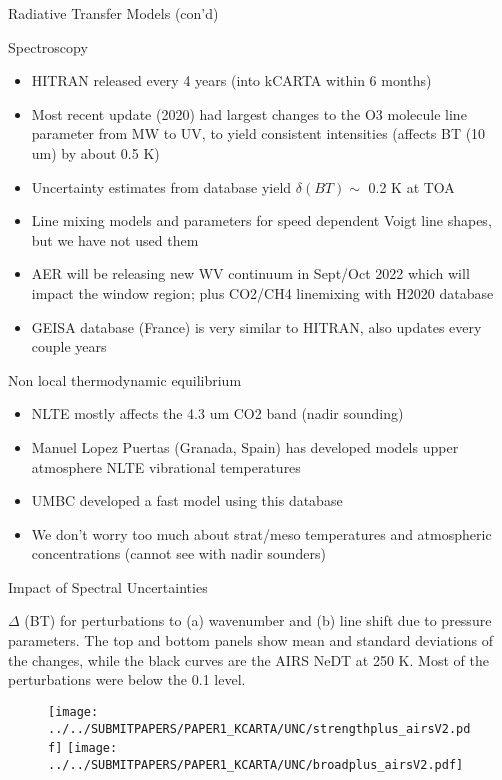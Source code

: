 \documentclass[10pt,t]{beamer}
\begin{document}
\begin{frame}[shrink=2]{Radiative Transfer Models (con'd)}
\begin{block}{Spectroscopy}
  \begin{itemize}
  \item HITRAN released every 4 years (into kCARTA within 6 months)
  \item Most recent update (2020) had largest changes to the O3 molecule line parameter from MW to UV, to yield
        consistent intensities (affects BT (10 um) by about 0.5 K)
  \item Uncertainty estimates from database yield $\delta(BT) \sim$ 0.2 K at TOA  
  \item Line mixing models and parameters for speed dependent Voigt line shapes, but we have not used them 
  \item AER will be releasing new WV continuum in Sept/Oct 2022 which will impact the window region; plus CO2/CH4 linemixing
        with H2020 database
  \item GEISA database (France) is very similar to HITRAN, also updates every couple years

  \end{itemize}
\end{block}

\begin{block}{Non local thermodynamic equilibrium}
  \begin{itemize}
  \item NLTE mostly affects the 4.3 um CO2 band (nadir sounding)
  \item Manuel Lopez Puertas (Granada, Spain) has developed models upper atmosphere NLTE vibrational temperatures
  \item UMBC developed a fast model using this database
  \item We don't worry too much about strat/meso temperatures and atmospheric concentrations (cannot see with nadir sounders)
  \end{itemize}
\end{block}
\end{frame}

\begin{frame}{Impact of Spectral Uncertainties}

\begin{block}{}
$\Delta$ (BT) for perturbations to (a) wavenumber and (b)
  line shift due to pressure parameters. The top and bottom panels show mean and
  standard deviations of the changes, while the black curves are the
  AIRS NeDT at 250 K. Most of the perturbations were below the 0.1 \wn level.
\begin{figure}
\begin{center}
\texttt{[image: ../../SUBMITPAPERS/PAPER1\_KCARTA/UNC/strengthplus\_airsV2.pdf]}
\texttt{[image: ../../SUBMITPAPERS/PAPER1\_KCARTA/UNC/broadplus\_airsV2.pdf]}
\end{center}
\end{figure}
\end{block}
\end{frame}
\end{document}
